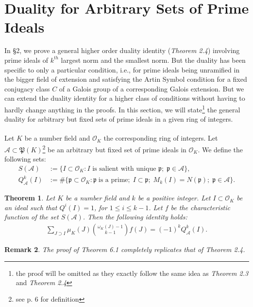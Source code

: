 \documentclass[12pt]{article}
\numberwithin{equation}{section}
\newtheorem{theorem}{Theorem}[section]
\newtheorem{remark}[theorem]{Remark}
\numberwithin{equation}{section}
\begin{document}
\section{Duality for Arbitrary Sets of Prime Ideals}
In \S2, we prove a general higher order duality identity (\textit{Theorem 2.4}) involving prime ideals of $k^{th}$ largest norm and the smallest norm. But the duality has been specific to only a particular condition, i.e., for prime ideals being unramified in the bigger field of extension and satisfying the Artin Symbol condition for a fixed conjugacy class $C$ of a Galois group of a corresponding Galois extension. But we can extend the duality identity for a higher class of conditions without having to hardly change anything in the proofs. In this section, we will state\footnote[14]{the proof will be omitted as they exactly follow the same idea as \textit{Theorem 2.3} and \textit{Theorem 2.4}} the general duality for arbitrary but fixed sets of prime ideals in a given ring of integers. \\ \\
Let $K $ be a number field and $\mathcal{O}_K$ the corresponding ring of integers. Let $\mathcal{A}\subset \mathfrak{P}(K)$\footnote[15]{see p. 6 for definition} be an arbitrary but fixed set of prime ideals in $\mathcal{O}_K$. We define the following sets:
\begin{align}
    S(\mathcal{A})&:=\{I\subset\mathcal{O}_K:I \text{ is salient with unique }\mathfrak{p};\;\mathfrak{p}\in\mathcal{A}\} ,\nonumber \\
    Q_{\mathcal{A}}^k(I)&:=\#\{\mathfrak{p}\subset \mathcal{O}_K:\mathfrak{p}\;\text{is a prime};\;I\subset\mathfrak{p};\;M_k(I)=N(\mathfrak{p});\;\mathfrak{p}\in\mathcal{A}\} .\nonumber
\end{align}
\begin{theorem}
      Let $K$ be a number field and $k$ be a positive integer. Let $I \subset \mathcal{O}_K$ be an ideal such that $Q^i(I)=1$, for $1 \leq i\leq k-1$. Let $f$ be the characteristic function of the set $S(\mathcal{A})$. Then the following identity holds:
    \begin{align}
        \sum_{J \supset I}\mu_K(J){{\omega_K(J)-1} \choose k-1}f(J) = (-1)^kQ_{\mathcal{A}}^k(I). \nonumber
    \end{align}
\end{theorem}
\begin{remark}
    The proof of \textit{Theorem 6.1} completely replicates that of \textit{Theorem 2.4}.
\end{remark} 
\end{document}
